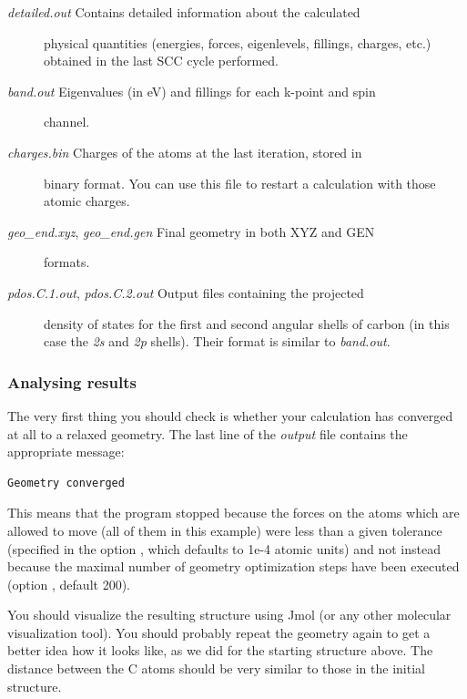 \documentclass[a4paper,11pt,english]{sphinxmanual}
\begin{document}
{{\begin{description}
\item[{\emph{detailed.out} Contains detailed information about the calculated}] \leavevmode
physical quantities (energies, forces, eigenlevels, fillings,
charges, etc.)  obtained in the last SCC cycle performed.

\item[{\emph{band.out} Eigenvalues (in eV) and fillings for each k-point and spin}] \leavevmode
channel.

\item[{\emph{charges.bin} Charges of the atoms at the last iteration, stored in}] \leavevmode
binary format. You can use this file to restart a calculation with
those atomic charges.

\item[{\emph{geo\_end.xyz}, \emph{geo\_end.gen} Final geometry in both XYZ and GEN}] \leavevmode
formats.

\item[{\emph{pdos.C.1.out}, \emph{pdos.C.2.out} Output files containing the projected}] \leavevmode
density of states for the first and second angular shells of carbon
(in this case the \emph{2s} and \emph{2p} shells). Their format is similar to
\emph{band.out}.

\end{description}


\subsubsection{Analysing results}
\label{electstruct:analysing-results}
The very first thing you should check is whether your calculation has
converged at all to a relaxed geometry. The last line of the \emph{output}
file contains the appropriate message:

\begin{Verbatim}[commandchars=\\\{\}]
Geometry converged
\end{Verbatim}

This means that the program stopped because the forces on the atoms
which are allowed to move (all of them in this example) were less than
a given tolerance (specified in the option ,
which defaults to 1e-4 atomic units) and not instead because the
maximal number of geometry optimization steps have been executed
(option , default 200).

You should visualize the resulting structure using Jmol (or any other
molecular visualization tool). You should probably repeat the geometry
again to get a better idea how it looks like, as we did for the
starting structure above. The distance between the C atoms should be
very similar to those in the initial structure.

}}
\end{document}
